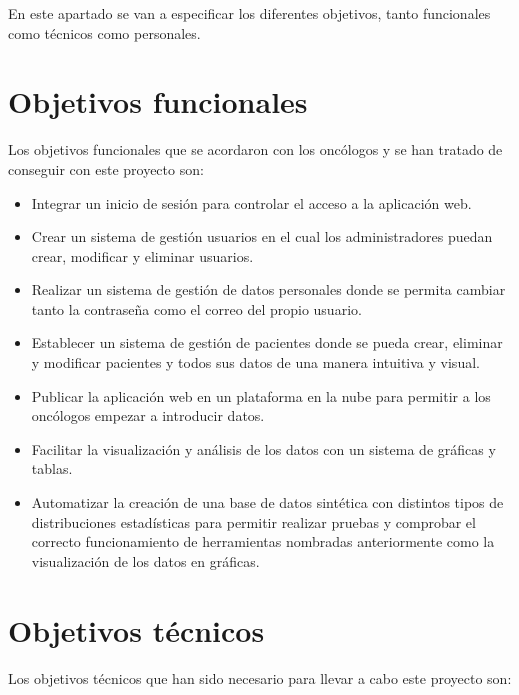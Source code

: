 
En este apartado se van a especificar los diferentes objetivos, tanto funcionales como técnicos como personales.

\section{Objetivos funcionales}

Los objetivos funcionales que se acordaron con los oncólogos y se han tratado de conseguir con este proyecto son:

\begin{itemize}
    \item Integrar un inicio de sesión para controlar el acceso a la aplicación web.
	\item Crear un sistema de gestión usuarios en el cual los administradores puedan crear, modificar y eliminar usuarios.
	\item Realizar un sistema de gestión de datos personales donde se permita cambiar tanto la contraseña como el correo del propio usuario.
	\item Establecer un sistema de gestión de pacientes donde se pueda crear, eliminar y modificar pacientes y todos sus datos de una manera intuitiva y visual.
	\item Publicar la aplicación web en un plataforma en la nube para permitir a los oncólogos empezar a introducir datos.
	\item Facilitar la visualización y análisis de los datos con un sistema de gráficas y tablas.
	\item Automatizar la creación de una base de datos sintética con distintos tipos de distribuciones estadísticas para permitir realizar pruebas y comprobar el correcto funcionamiento de herramientas nombradas anteriormente como la visualización de los datos en gráficas.
\end{itemize}
\section{Objetivos técnicos}
Los objetivos técnicos que han sido necesario para llevar a cabo este proyecto son:

